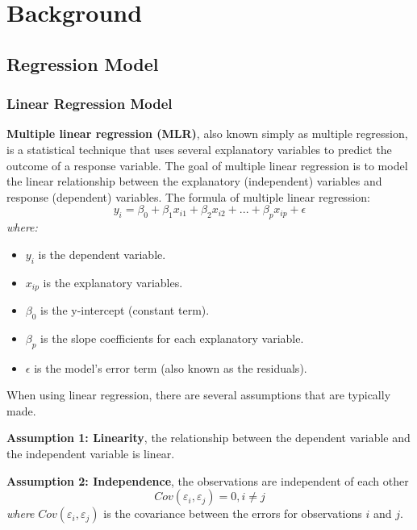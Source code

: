 %
%
\clearpage
\section{Background}
\subsection{Regression Model}
\subsubsection{Linear Regression Model}

\noindent 

\textbf{Multiple linear regression (MLR)}, also known simply as multiple regression, is a statistical technique that uses several explanatory variables to predict the outcome of a response variable. The goal of multiple linear regression is to model the linear relationship between the explanatory (independent) variables and response (dependent) variables. The formula of multiple linear regression:
$$
{y}_{i}={\beta}_{0}+{\beta}_{1} {x}_{i1}+{\beta}_{2} {x}_{i2}+...+{\beta}_{p} {x}_{ip}+\epsilon
$$
\textit{where:}
\begin{itemize}
    \item ${y}_{i}$ is the dependent variable.
    \item ${x}_{ip}$ is the explanatory variables.
    \item ${\beta}_{0}$ is the y-intercept (constant term).
    \item ${\beta}_{p}$ is the slope coefficients for each explanatory variable.
    \item $\epsilon$ is the model's error term (also known as the residuals).
\end{itemize}

When using linear regression, there are several assumptions that are typically made.

\textbf{Assumption 1: Linearity}, the relationship between the dependent variable and the independent variable is linear.

\textbf{Assumption 2: Independence}, the observations are independent of each other
$$
Cov({\varepsilon}_{i},{\varepsilon}_{j})=0,i\neq j
$$
\textit{where} $Cov({\varepsilon}_{i},{\varepsilon}_{j})$ is the covariance between the errors for observations $i$ and $j$.


